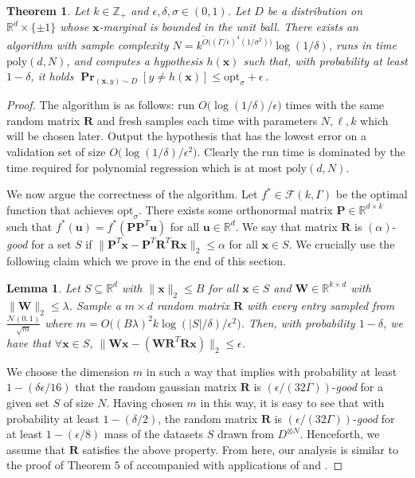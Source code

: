 \documentclass[10pt,a4paper]{article}
\newtheorem{theorem}{Theorem}[section]
\newtheorem{lemma}{Lemma}[section]
\newcommand\twonorm[1]{\|#1\|_2}
\renewcommand\vec[1]{\mathbf{#1}}
\DeclareMathOperator*{\pr}{\mathbf{Pr}}
\newcommand{\R}{\mathbb{R}}
\newcommand{\eps}{\epsilon}
\newcommand{\poly}{\mathrm{poly}}
\newcommand{\opt}{\mathrm{opt}}
\newcommand{\1}{\Ind}
\newcommand{\smoothopt}{\mathrm{opt}_{\sigma}}
\newcommand{\x}{\vec x}
\newcommand{\vu}{\vec u}
\newcommand{\F}{\mathcal{F}}
\newcommand{\Gauss}{\mathcal{N}}
\newcommand{\Djoint}{D}
\begin{document}
\begin{theorem}
\label{thm:random_proj_bounded}
    Let $k \in \mathbb Z_+$ and $\epsilon, \delta,\sigma \in (0,1)$. Let $D$ be a distribution on $\R^d\times \{\pm 1\}$ whose $\x$-marginal is bounded in the unit ball.  There exists an algorithm with sample complexity $N = k^{\tilde{O}\big((\Gamma/\epsilon)^4(1/\sigma^2)\big)}\log (1/\delta)$, runs in time $\poly(d,N)$, and computes a hypothesis $h(\x)$ such that, with probability at least $1-\delta$, it holds
    $ \pr_{(\x, y) \sim \Djoint}[y\neq h(\x)] \le \opt_\sigma + \eps\,$. %
\end{theorem}
\begin{proof}
The algorithm is as follows: run  $O\bigl(\log(1/\delta)/\epsilon\bigr)$ times with the same random matrix $\vec R$ and fresh samples each time with parameters $N,\ell,k$ which will be chosen later. Output the hypothesis that has the lowest error on a validation set of size $O\bigl(\log(1/\delta)/\epsilon^2\bigr)$. Clearly the run time is dominated by the time required for polynomial regression which is at most $\poly(d,N)$.

We now argue the correctness of the algorithm. Let $f^*\in \F(k,\Gamma)$ be the optimal function that achieves $\smoothopt$. There exists some orthonormal matrix $\vec P\in\R^{d\times k}$ such that $f^*(\vu)=f^*(\vec P \vec P^T \vu)$ for all $\vu\in \R^{d}$. We say that matrix $\vec R$ is $(\alpha)$-\textit{good} for a set $S$ if $\twonorm{\vec P^T \x-\vec P^T\vec R^T\vec R\x}\leq \alpha$ for all $\x\in S$. We crucially use the following claim which we prove in the end of this section.
\begin{lemma}
\label{lem:dim_red_norm}
     Let $S\subseteq \R^d$ with $\twonorm{\x}\leq B$ for all $\x\in S$ and $\vec W\in \R^{k\times d}$ with $\twonorm{\vec W}\leq \lambda$. Sample a $m\times d$ random matrix $\vec R$ with every entry sampled from $\frac{\Gauss(0,1)}{\sqrt{m}}$  where $m=O\bigl((B\lambda)^2k\log (|S|/\delta)/\epsilon^2\bigr)$. Then, with probability $1-\delta$, we have that $\forall \x\in S$, $\twonorm{\vec W\x - (\vec W\vec R^T\vec R\x)}\leq \epsilon$.
\end{lemma}

We choose the dimension $m$ in such a way that  implies with probability at least  $1-(\delta\epsilon/16)$ that the random gaussian matrix $\vec R$ is $(\epsilon/(32\Gamma))$-\textit{good} for a given set $S$ of size $N$. Having chosen $m$ in this way, it is easy to see that with probability at least $1-(\delta/2)$, the random matrix $\vec R$ is $(\epsilon/(32\Gamma))$-\textit{good} for at least $1-(\epsilon/8)$ mass of the datasets $S$ drawn from $D^{\otimes N}$. Henceforth, we assume that $\vec R$ satisfies the above property. From here, our analysis is similar to the proof of Theorem $5$ of \cite{KKMS:05} accompanied with applications of  and . 


\end{proof}
\end{document}
